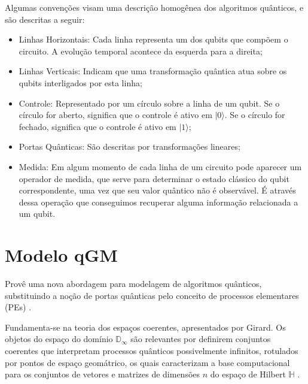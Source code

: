 \documentclass[tcc,capa]{texufpel}
\begin{document}
Algumas convenções visam uma descrição homogênea dos algoritmos quânticos, e são descritas a seguir:
\begin{itemize}
\item[\textendash] Linhas Horizontais: Cada linha representa um dos qubits que compõem o circuito. A evolução temporal acontece da esquerda para a direita;
\item[\textendash] Linhas Verticais: Indicam que uma transformação quântica atua sobre os qubits interligados por esta linha;
\item[\textendash] Controle: Representado por um círculo sobre a linha de um qubit. Se o círculo for aberto, significa que o controle é ativo em $|0\rangle$. Se o círculo for fechado, significa que o controle é ativo em $|1\rangle$;
\item[\textendash] Portas Quânticas: São descritas por transformações lineares;
\item[\textendash] Medida: Em algum momento de cada linha de um circuito pode aparecer um operador de medida, que serve para determinar o estado clássico do qubit correspondente, uma vez que seu valor quântico não é observável. É através dessa operação que conseguimos recuperar alguma informação relacionada a um qubit.
\end{itemize}





\section{Modelo qGM}
Provê uma nova abordagem para modelagem de algoritmos quânticos, substituindo a noção de portas quânticas pelo conceito de processos elementares (PEs) \cite{Schmalfuss14}.

Fundamenta-se na teoria dos espaços coerentes, apresentados por Girard. Os objetos do espaço do domínio $\mathbb{D}_\infty$ são relevantes por definirem conjuntos coerentes que interpretam processos quânticos possivelmente infinitos, rotulados por pontos de espaço geomátrico, os quais caracterizam a base computacional para os conjuntos de vetores e matrizes de dimensões $n$ do espaço de Hilbert $\mathbb{H}$ \cite{maron:2013:ccgrid}.
\end{document}
